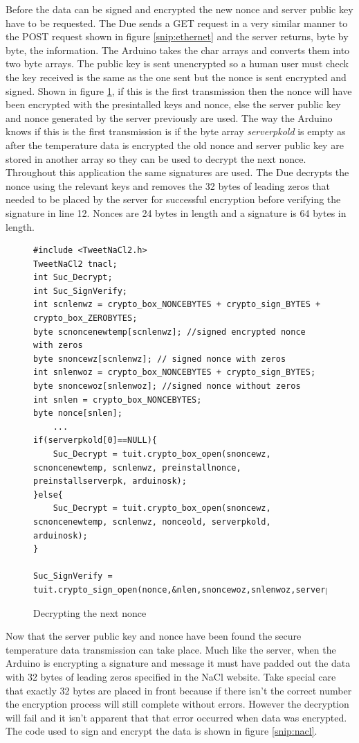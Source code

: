 Before the data can be signed and encrypted the new nonce and server public key have to be requested. The Due sends a GET request in a very similar manner to the POST request shown in figure \ref{snip:ethernet} and the server returns, byte by byte, the information. The Arduino takes the char arrays and converts them into two byte arrays. The public key is sent unencrypted so a human user must check the key received is the same as the one sent but the nonce is sent encrypted and signed. Shown in figure \ref{snip:denonce}, if this is the first transmission then the nonce will have been encrypted with the presintalled keys and nonce, else the server public key and nonce generated by the server previously are used. The way the Arduino knows if this is the first transmission is if the byte array \emph{serverpkold} is empty as after the temperature data is encrypted the old nonce and server public key are stored in another array so they can be used to decrypt the next nonce. Throughout this application the same signatures are used. The Due decrypts the nonce using the relevant keys and removes the 32 bytes of leading zeros that needed to be placed by the server for successful encryption before verifying the signature in line 12. Nonces are 24 bytes in length and a signature is 64 bytes in length.

\begin{figure}[H]
\begin{lstlisting}[style=Arduino]
#include <TweetNaCl2.h>
TweetNaCl2 tnacl;
int Suc_Decrypt;
int Suc_SignVerify;
int scnlenwz = crypto_box_NONCEBYTES + crypto_sign_BYTES + crypto_box_ZEROBYTES; 
byte scnoncenewtemp[scnlenwz]; //signed encrypted nonce with zeros
byte snoncewz[scnlenwz]; // signed nonce with zeros
int snlenwoz = crypto_box_NONCEBYTES + crypto_sign_BYTES;
byte snoncewoz[snlenwoz]; //signed nonce without zeros
int snlen = crypto_box_NONCEBYTES;
byte nonce[snlen];
	...
if(serverpkold[0]==NULL){
	Suc_Decrypt = tuit.crypto_box_open(snoncewz, scnoncenewtemp, scnlenwz, preinstallnonce, preinstallserverpk, arduinosk); 
}else{
	Suc_Decrypt = tuit.crypto_box_open(snoncewz, scnoncenewtemp, scnlenwz, nonceold, serverpkold, arduinosk);
}

Suc_SignVerify = tuit.crypto_sign_open(nonce,&nlen,snoncewoz,snlenwoz,serverpksign);

\end{lstlisting}
\caption{Decrypting the next nonce}
\label{snip:denonce}
\end{figure}

Now that the server public key and nonce have been found the secure temperature data transmission can take place. Much like the server, when the Arduino is encrypting a signature and message it must have padded out the data with 32 bytes of leading zeros specified in the NaCl website. Take special care that exactly 32 bytes are placed in front because if there isn't the correct number the encryption process will still complete without errors. However the decryption will fail and it isn't apparent that that error occurred when data was encrypted. The code used to sign and encrypt the data is shown in figure \ref{snip:nacl}.

